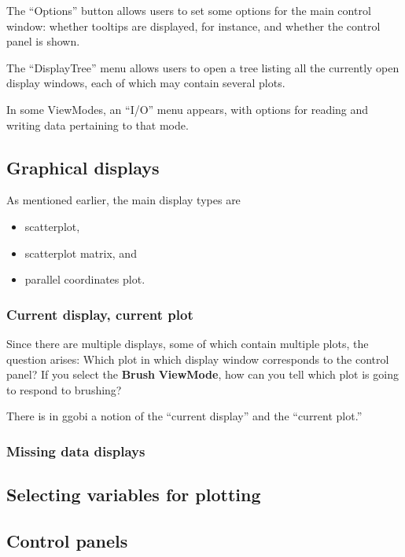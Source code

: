 \documentclass[11pt]{article}
\begin{document}
The ``Options'' button allows users to set some options for the
main control window:  whether tooltips are displayed, for instance,
and whether the control panel is shown.

The ``DisplayTree'' menu allows users to open a tree listing
all the currently open display windows, each of which may contain
several plots.

In some ViewModes, an ``I/O'' menu appears, with options for
reading and writing data pertaining to that mode.

\subsection{Graphical displays}
\label{slbl:GraphicalDisplays}

As mentioned earlier, the main display types are
\begin{itemize}
\itemsep 0em
\item scatterplot,
\item scatterplot matrix, and
\item parallel coordinates plot.
\end{itemize}

\subsubsection{Current display, current plot}

Since there are multiple displays, some of which contain
multiple plots, the question arises:  Which plot in which
display window corresponds to the control panel?  If you
select the {\bf Brush} {\bf ViewMode}, how can you tell
which plot is going to respond to brushing?

There is in ggobi a notion of the ``current display'' and
the ``current plot.''

\subsubsection{Missing data displays}



\subsection{Selecting variables for plotting}
\subsection{Control panels}
\end{document}
